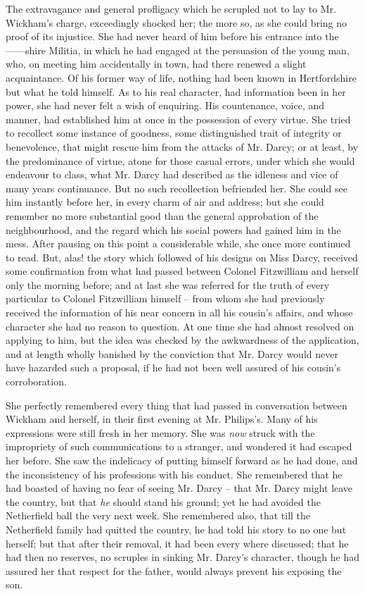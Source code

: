 The extravagance and general profligacy which he
scrupled not to lay to Mr. Wickham’s charge, exceedingly
shocked her; the more so, as she could bring no proof
of its injustice. She had never heard of him before his
entrance into the ------shire Militia, in which he had
engaged at the persuasion of the young man, who, on
meeting him accidentally in town, had there renewed
a slight acquaintance. Of his former way of life, nothing
had been known in Hertfordshire but what he told himself.
As to his real character, had information been in her
power, she had never felt a wish of enquiring. His countenance,
voice, and manner, had established him at once
in the possession of every virtue. She tried to recollect
some instance of goodness, some distinguished trait of
integrity or benevolence, that might rescue him from
the attacks of Mr. Darcy; or at least, by the predominance
of virtue, atone for those casual errors, under which she
would endeavour to class, what Mr. Darcy had described
as the idleness and vice of many years continuance.
But no such recollection befriended her. She could see
him instantly before her, in every charm of air and address;
but she could remember no more substantial good than
the general approbation of the neighbourhood, and the
regard which his social powers had gained him in the mess.
After pausing on this point a considerable while, she once
more continued to read. But, alas! the story which
followed of his designs on Miss Darcy, received some
confirmation from what had passed between Colonel
Fitzwilliam and herself only the morning before; and at
last she was referred for the truth of every particular to
Colonel Fitzwilliam himself -- from whom she had previously
received the information of his near concern in all his
cousin’s affairs, and whose character she had no reason
to question. At one time she had almost resolved on
applying to him, but the idea was checked by the awkwardness
of the application, and at length wholly banished
by the conviction that Mr. Darcy would never have
hazarded such a proposal, if he had not been well assured
of his cousin’s corroboration.

She perfectly remembered every thing that had passed
in conversation between Wickham and herself, in their
first evening at Mr. Philips’s. Many of his expressions
were still fresh in her memory. She was \textit{now} struck with
the impropriety of such communications to a stranger,
and wondered it had escaped her before. She saw the
indelicacy of putting himself forward as he had done,
and the inconsistency of his professions with his conduct.
She remembered that he had boasted of having no fear
of seeing Mr. Darcy -- that Mr. Darcy might leave the
country, but that \textit{he} should stand his ground; yet he
had avoided the Netherfield ball the very next week.
She remembered also, that till the Netherfield family had
quitted the country, he had told his story to no one but
herself; but that after their removal, it had been every
where discussed; that he had then no reserves, no scruples
in sinking Mr. Darcy’s character, though he had assured
her that respect for the father, would always prevent his
exposing the son.

